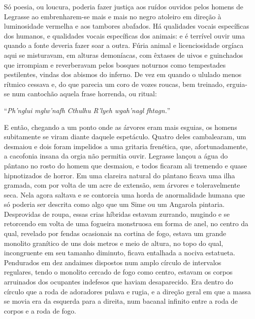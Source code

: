 Só poesia, ou loucura, poderia fazer justiça aos ruídos ouvidos pelos
homens de Legrasse ao embrenharem-se mais e mais no negro atoleiro em
direção à luminosidade vermelha e aos tambores abafados. Há qualidades
vocais específicas dos humanos, e qualidades vocais específicas dos
animais: e é terrível ouvir uma quando a fonte deveria fazer soar a
outra. Fúria animal e licenciosidade orgíaca aqui se misturavam, em
alturas demoníacas, com êxtases de uivos e guinchados que irrompiam e
reverberavam pelos bosques noturnos como tempestades pestilentes, vindas
dos abismos do inferno. De vez em quando o ululado menos rítmico cessava
e, do que parecia um coro de vozes roucas, bem treinado, erguia-se num
cantochão aquela frase horrenda, ou ritual:

``\emph{Ph'nglui mglw'nafh Cthulhu R'lyeh wgah'nagl fhtagn.}''

E então, chegando a um ponto onde as árvores eram mais esguias, os
homens subitamente se viram diante daquele espetáculo. Quatro deles
cambalearam, um desmaiou e dois foram impelidos a uma gritaria
frenética, que, afortunadamente, a cacofonia insana da orgia não
permitia ouvir. Legrasse lançou a água do pântano no rosto do homem que
desmaiou, e todos ficaram ali tremendo e quase hipnotizados de horror.
Em uma clareira natural do pântano ficava uma ilha gramada, com por
volta de um acre de extensão, sem árvores e toleravelmente seca. Nela
agora saltava e se contorcia uma horda de anormalidade humana que só
poderia ser descrita como algo que um Sime ou um Angarola pintaria. Desprovidas de
roupa, essas crias híbridas estavam zurrando, mugindo e se retorcendo em
volta de uma fogueira monstruosa em forma de anel, no centro da qual,
revelado por fendas ocasionais na cortina de fogo, estava um grande
monolito granítico de uns dois metros e meio de altura, no topo do qual,
incongruente em seu tamanho diminuto, ficava entalhada a nociva
estatueta. Pendurados em dez andaimes dispostos num amplo círculo de
intervalos regulares, tendo o monolito cercado de fogo como centro,
estavam os corpos arruinados dos ocupantes indefesos que haviam
desaparecido. Era dentro do círculo que a roda de adoradores pulava e
rugia, e a direção geral em que a massa se movia era da esquerda para a
direita, num bacanal infinito entre a roda de corpos e a roda de fogo.


